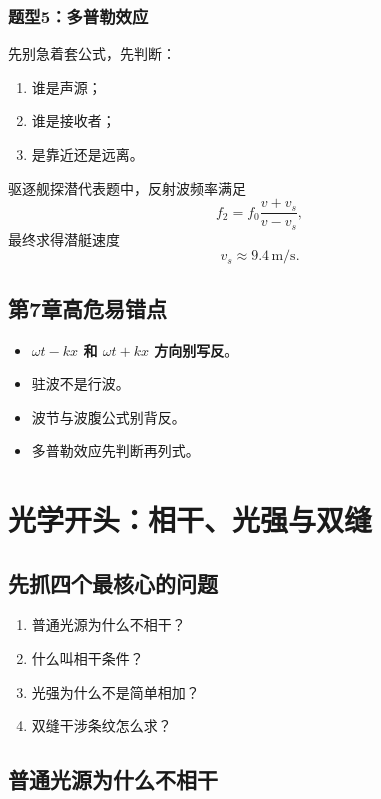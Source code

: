 \documentclass[12pt,a4paper]{article}
\newcommand{\warn}[1]{\textcolor{red!70!black}{\textbf{#1}}}
\begin{document}
\subsubsection*{题型5：多普勒效应}

先别急着套公式，先判断：

\begin{enumerate}
  \item 谁是声源；
  \item 谁是接收者；
  \item 是靠近还是远离。
\end{enumerate}

驱逐舰探潜代表题中，反射波频率满足
\[
f_2 = f_0 \frac{v+v_s}{v-v_s},
\]
最终求得潜艇速度
\[
v_s \approx 9.4\,\mathrm{m/s}.
\]

\subsection{第7章高危易错点}

\begin{itemize}
  \item \warn{$\omega t-kx$ 和 $\omega t+kx$ 方向别写反}。
  \item 驻波不是行波。
  \item 波节与波腹公式别背反。
  \item 多普勒效应先判断再列式。
\end{itemize}

\section{光学开头：相干、光强与双缝}

\subsection{先抓四个最核心的问题}

\begin{enumerate}
  \item 普通光源为什么不相干？
  \item 什么叫相干条件？
  \item 光强为什么不是简单相加？
  \item 双缝干涉条纹怎么求？
\end{enumerate}

\subsection{普通光源为什么不相干}
\end{document}

